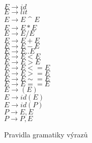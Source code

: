 \begin{figure}
$ E \rightarrow id $ \\
$ E \rightarrow	lit $ \\
$ E \rightarrow E $ \^{ } $ E $ \\
$ E \rightarrow	E * E $ \\
$ E \rightarrow	E / E $ \\
$ E \rightarrow E + E $ \\
$ E \rightarrow	E - E $ \\
$ E \rightarrow	E .. E $ \\
$ E \rightarrow	E < E $ \\
$ E \rightarrow	E > E $ \\
$ E \rightarrow	E <= E $ \\
$ E \rightarrow	E >= E $ \\
$ E \rightarrow	E \sim= E $ \\
$ E \rightarrow	E == E $ \\
$ E \rightarrow	( E ) $ \\
$ E \rightarrow	id ( E ) $ \\
$ E \rightarrow	id ( P ) $ \\
$ P \rightarrow E, E $ \\
$ P \rightarrow	P, E $ \\
\caption{Pravidla gramatiky výrazů}
\label{syn.expr}
\end{figure}
